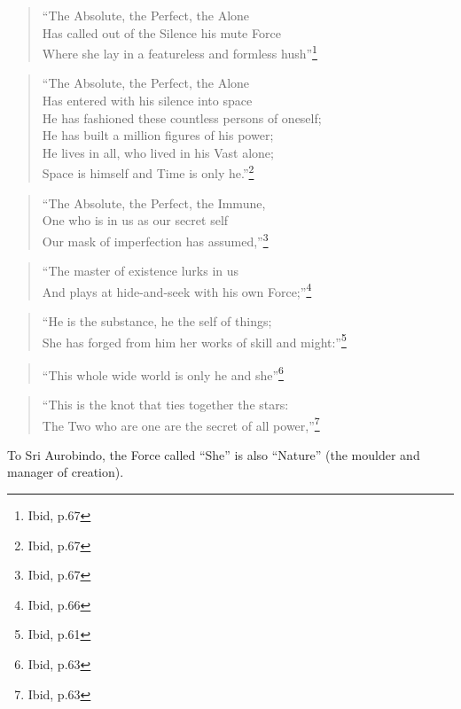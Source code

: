 \documentclass[12pt,a4paper]{book}
\begin{document}
\begin{verse}
``The Absolute, the Perfect, the Alone\\
Has called out of the Silence his mute Force\\
Where she lay in a featureless and formless hush''\footnote{Ibid, p.67}
\end{verse}

\begin{verse}
``The Absolute, the Perfect, the Alone\\
Has entered with his silence into space\\
He has fashioned these countless persons of oneself;\\
He has built a million figures of his power;\\
He lives in all, who lived in his Vast alone;\\
Space is himself and Time is only he.''\footnote{Ibid, p.67}
\end{verse}

\begin{verse}
``The Absolute, the Perfect, the Immune,\\
One who is in us as our secret self\\
Our mask of imperfection has assumed,''\footnote{Ibid, p.67}
\end{verse}

\begin{verse}
``The master of existence lurks in us\\
And plays at hide-and-seek with his own Force;''\footnote{Ibid, p.66}
\end{verse}

\begin{verse}
``He is the substance, he the self of things;\\
She has forged from him her works of skill and might:''\footnote{Ibid, p.61}
\end{verse}

\begin{verse}
``This whole wide world is only he and she''\footnote{Ibid, p.63}
\end{verse}

\begin{verse}
``This is the knot that ties together the stars:\\
The Two who are one are the secret of all power,''\footnote{Ibid, p.63}
\end{verse}

To Sri Aurobindo, the Force called ``She'' is also ``Nature'' (the
moulder and manager of creation).
\end{document}
